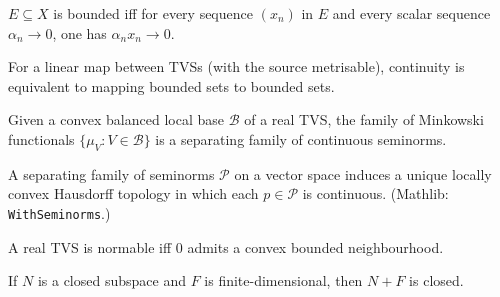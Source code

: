 \begin{theorem}
  \label{thm:bounded-iff-smul-tendsto-zero}
  \leanok
  $E \subseteq X$ is bounded iff for every sequence $(x_n)$ in $E$ and
  every scalar sequence $\alpha_n \to 0$, one has $\alpha_n x_n \to 0$.
\end{theorem}

\begin{theorem}
  \label{thm:linear-cont-iff-bounded}
  \leanok
  For a linear map between TVSs (with the source metrisable),
  continuity is equivalent to mapping bounded sets to bounded sets.
\end{theorem}

\begin{theorem}
  \label{thm:minkowski-separating-seminorms}
  \leanok
  Given a convex balanced local base $\mathcal B$ of a real TVS, the
  family of Minkowski functionals $\{\mu_V : V \in \mathcal B\}$ is a
  separating family of continuous seminorms.
\end{theorem}

\begin{theorem}
  \label{thm:topology-of-seminorms}
  \leanok
  A separating family of seminorms $\mathcal P$ on a vector space
  induces a unique locally convex Hausdorff topology in which each
  $p \in \mathcal P$ is continuous. (Mathlib: \texttt{WithSeminorms}.)
\end{theorem}

\begin{theorem}
  \label{thm:normable-iff-convex-bounded-nhd}
  \leanok
  A real TVS is normable iff $0$ admits a convex bounded neighbourhood.
\end{theorem}

\begin{theorem}
  \label{thm:add-closed-fd-closed}
  \leanok
  If $N$ is a closed subspace and $F$ is finite-dimensional, then
  $N + F$ is closed.
\end{theorem}


